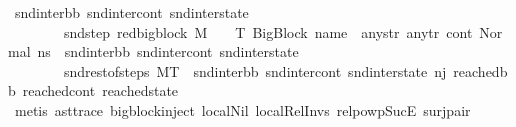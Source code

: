 \begin{isabellebody}
\ snd{\isacharunderscore}{\kern0pt}inter{\isacharunderscore}{\kern0pt}bb\ snd{\isacharunderscore}{\kern0pt}inter{\isacharunderscore}{\kern0pt}cont\ snd{\isacharunderscore}{\kern0pt}inter{\isacharunderscore}{\kern0pt}state\ \isanewline
\ \ \ \ \ \ \ \ snd{\isacharunderscore}{\kern0pt}step{\isacharcolon}{\kern0pt}\ {\isachardoublequoteopen}red{\isacharunderscore}{\kern0pt}bigblock\ M\ {\isasymLambda}\ {\isasymGamma}\ {\isasymOmega}\ T\ {\isacharparenleft}{\kern0pt}{\isacharparenleft}{\kern0pt}BigBlock\ name\ {\isacharbrackleft}{\kern0pt}{\isacharbrackright}{\kern0pt}\ any{\isacharunderscore}{\kern0pt}str\ any{\isacharunderscore}{\kern0pt}tr{\isacharparenright}{\kern0pt}{\isacharcomma}{\kern0pt}\ cont{}{\isacharcomma}{\kern0pt}\ {\isacharparenleft}{\kern0pt}Normal\ ns{}{\isacharparenright}{\kern0pt}{\isacharparenright}{\kern0pt}\ \ {\isacharparenleft}{\kern0pt}snd{\isacharunderscore}{\kern0pt}inter{\isacharunderscore}{\kern0pt}bb{\isacharcomma}{\kern0pt}\ snd{\isacharunderscore}{\kern0pt}inter{\isacharunderscore}{\kern0pt}cont{\isacharcomma}{\kern0pt}\ snd{\isacharunderscore}{\kern0pt}inter{\isacharunderscore}{\kern0pt}state{\isacharparenright}{\kern0pt}{\isachardoublequoteclose}\ \isanewline
\ \ \ \ \ \ \ \ snd{\isacharunderscore}{\kern0pt}rest{\isacharunderscore}{\kern0pt}of{\isacharunderscore}{\kern0pt}steps{\isacharcolon}{\kern0pt}\ {\isachardoublequoteopen}M{\isacharcomma}{\kern0pt}{\isasymLambda}{\isacharcomma}{\kern0pt}{\isasymGamma}{\isacharcomma}{\kern0pt}{\isasymOmega}{\isacharcomma}{\kern0pt}T\ {\isasymturnstile}\ {\isacharparenleft}{\kern0pt}snd{\isacharunderscore}{\kern0pt}inter{\isacharunderscore}{\kern0pt}bb{\isacharcomma}{\kern0pt}\ snd{\isacharunderscore}{\kern0pt}inter{\isacharunderscore}{\kern0pt}cont{\isacharcomma}{\kern0pt}\ snd{\isacharunderscore}{\kern0pt}inter{\isacharunderscore}{\kern0pt}state{\isacharparenright}{\kern0pt}\ {\isacharminus}{\kern0pt}n{\isasymlongrightarrow}{\isacharcircum}{\kern0pt}j{\isacharprime}{\kern0pt}\ {\isacharparenleft}{\kern0pt}reached{\isacharunderscore}{\kern0pt}bb{\isacharcomma}{\kern0pt}\ reached{\isacharunderscore}{\kern0pt}cont{\isacharcomma}{\kern0pt}\ reached{\isacharunderscore}{\kern0pt}state{\isacharparenright}{\kern0pt}{\isachardoublequoteclose}\isanewline
\ \ \ \ \ \ \ \ \isamarkupfalse%
\ {\isacharparenleft}{\kern0pt}metis\ ast{\isacharunderscore}{\kern0pt}trace\ bigblock{\isachardot}{\kern0pt}inject\ local{\isachardot}{\kern0pt}Nil\ local{\isachardot}{\kern0pt}Rel{\isacharunderscore}{\kern0pt}Invs\ relpowp{\isacharunderscore}{\kern0pt}Suc{\isacharunderscore}{\kern0pt}E{}\ surj{\isacharunderscore}{\kern0pt}pair{\isacharparenright}{\kern0pt}\isanewline

\end{isabellebody}
